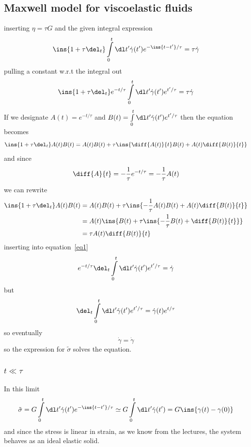 \subsection{Maxwell model for viscoelastic fluids}
inserting \(\eta = \tau G\) and the given integral expression
\begin{align}\label{eq1}
	\ins{1+\tau\del_t}\int\limits_0^t \dl t' \dot{\gamma}(t') e^{-\ins{t-t'}/\tau} = \tau\dot{\gamma}
\end{align}
pulling a constant w.r.t the integral out
\begin{equation}
	\ins{1+\tau\del_t}e^{-t/\tau}\int\limits_0^t \dl t' \dot{\gamma}(t') e^{t'/\tau} = \tau\dot{\gamma}
\end{equation}
If we designate \(A(t) = e^{-t/\tau}\) and \(B(t) = \int\limits_0^t \dl t' \dot{\gamma}(t') e^{t'/\tau}\) then the equation becomes
\begin{equation}
	\ins{1+\tau\del_t}A(t)B(t) = A(t)B(t) + \tau\ins{\diff{A(t)}{t}B(t)+A(t)\diff{B(t)}{t}}
\end{equation}
and since
\begin{equation}
	\diff{A}{t} = -\frac{1}{\tau}e^{-t/\tau} = -\frac{1}{\tau}A(t)
\end{equation}
we can rewrite
\begin{align}
	\ins{1+\tau\del_t}A(t)B(t) &= A(t)B(t) + \tau\ins{-\frac{1}{\tau}A(t)B(t)+A(t)\diff{B(t)}{t}} \\
	&= A(t)\ins{B(t) + \tau\ins{-\frac{1}{\tau}B(t)+\diff{B(t)}{t}}} \\
	&= \tau A(t)\diff{B(t)}{t}
\end{align}
inserting into equation~\ref{eq1}
\begin{equation}
	e^{-t/\tau}\del_t\int\limits_0^t \dl t' \dot{\gamma}(t') e^{t'/\tau} = \dot{\gamma}
\end{equation}
but
\begin{equation}
	\del_t\int\limits_0^t \dl t' \dot{\gamma}(t') e^{t'/\tau} = \dot{\gamma}(t)e^{t/\tau}
\end{equation}
so eventually
\begin{equation}
	\dot{\gamma} = \dot{\gamma}
\end{equation}
so the expression for \(\tilde{\sigma}\) solves the equation.
\subsubsection{\(t\ll\tau\)}
In this limit
\begin{equation}
	\tilde{\sigma} = G\int\limits_0^t \dl t' \dot{\gamma}(t') e^{-\ins{t-t'}/\tau} \simeq  G\int\limits_0^t \dl t' \dot{\gamma}(t') = G\ins{\gamma(t)-\gamma(0)}
\end{equation}
and since the stress is linear in strain, as we know from the lectures, the system behaves as an ideal elastic solid.
